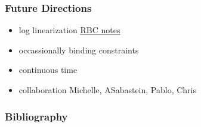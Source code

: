 \documentclass{beamer}
\begin{document}
 \begin{frame}
   \frametitle{Future Directions}
   \begin{itemize}
 \item log linearization 
 \href{http://web.mit.edu/14.452/www/pdf/rbc.pdf}{RBC notes}
\item occassionally binding constraints
\item continuous time
\item collaboration Michelle, ASabastein, Pablo, Chris
\end{itemize}
 \end{frame}


\begin{frame}
  \frametitle{Bibliography}
  


\end{frame}



\end{document}
